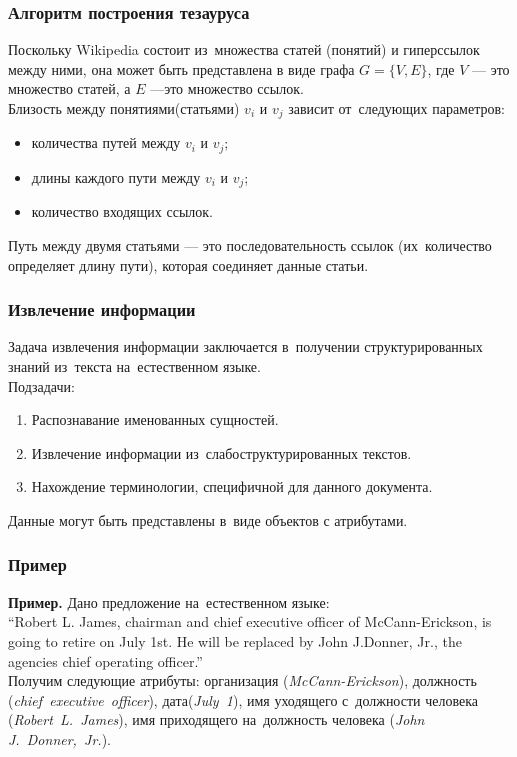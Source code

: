 \documentclass{beamer}
\begin{document}
\begin{frame}
\frametitle{Алгоритм построения тезауруса}
Поскольку Wikipedia состоит из~множества статей (понятий) и гиперссылок между ними, она может быть представлена
в виде графа $G = \{V,E\}$, где $V$  --- это множество статей, а $E$ ---это множество ссылок.\\
\vspace{0.3cm}
Близость между понятиями(статьями) $v_i$ и $v_j$ зависит от~следующих параметров:

\begin{itemize}
\item{количества путей между $v_i$ и $v_j$;}
\item{длины каждого пути между $v_i$ и $v_j$;}
\item{количество входящих ссылок.}
\end{itemize}

Путь между двумя статьями --- это последовательность ссылок (их~количество определяет длину пути), которая соединяет данные статьи.

\end{frame}

\begin{frame}
\frametitle{Извлечение информации}
Задача извлечения информации заключается в~получении структурированных знаний
из~текста на~естественном языке.\\

\vspace{0.5cm}
Подзадачи:
\begin{enumerate}
\item{Распознавание именованных сущностей.}
\item{Извлечение информации из~слабоструктурированных текстов.}
\item{Нахождение терминологии, специфичной для данного документа.}
\end{enumerate}

Данные могут быть представлены в~виде объектов с атрибутами.

\end{frame}

\begin{frame}
\frametitle{Пример}
\textbf{Пример.} Дано предложение на~естественном языке:\\ 
``Robert L. James, chairman and chief executive
officer of McCann-Erickson, is going to retire on July 1st. He will be replaced
by John J.Donner, Jr., the agencies chief operating officer.''\\
\vspace{1cm}
Получим следующие атрибуты: организация (\textsl{McCann-Erickson}), должность (\textsl{chief~executive~officer}), дата(\textsl{July~1}), имя уходящего с~должности человека (\textsl{Robert~L.~James}), имя
приходящего на~должность человека (\textsl{John~ J.~Donner,~Jr.}).
\end{frame}
\end{document}
